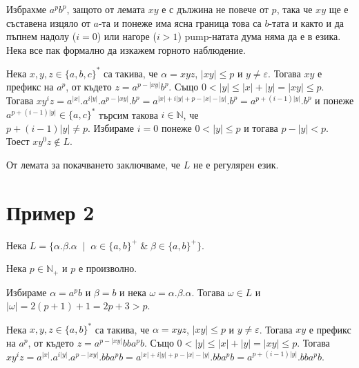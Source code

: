 \documentclass[12pt]{article}
\begin{document}
\vspace*{4mm}

\par Избрахме \(a^pb^p\), защото от лемата \(xy\) е с дължина не повече от \(p\), така че \(xy\) ще е съставена изцяло от \(a\)-та и понеже има ясна граница това са \(b\)-тата и както и да пъпнем надолу (\(i = 0\)) или нагоре (\(i > 1\)) pump-натата дума няма да е в езика. Нека все пак формално да изкажем горното наблюдение.

\vspace*{4mm}

\par Нека \(x, y, z \in \{a, b, c\}^*\) са такива, че \(\alpha = xyz\), \(|xy| \leq p\) и \(y \neq \varepsilon\).
Тогава \(xy\) е префикс на \(a^p\), от където \(z = a^{p - |xy|}b^p\). Също \(0 < |y| \leq |x| + |y| = |xy| \leq p\). Тогава \(xy^iz = a^{|x|}.a^{i|y|}.a^{p - |xy|}.b^p = a^{|x| + i|y| + p - |x| - |y|}.b^p = a^{p + (i - 1)|y|}.b^p\) и понеже \(a^{p + (i - 1)|y|} \in \{a, c\}^*\) търсим такова \(i \in \mathbb N\), че \\
\(p + (i - 1)|y| \neq p\). Избираме \(i = 0\) понеже \(0 < |y| \leq p\) и тогава \(p - |y| < p\).
Тоест \(xy^0z \notin L\).

\vspace*{4mm}

\par От лемата за покачването заключваме, че \(L\) не е регулярен език.

\section{Пример 2}
Нека \(L = \{\alpha.\beta.\alpha \;\mid\; \alpha \in \{a, b\}^+ \;\&\; \beta \in \{a, b\}^+\}\).

\vspace*{5mm}

Нека \(p \in \mathbb{N}_+\) и \(p\) е произволно.

\vspace*{5mm}

Избираме \(\alpha = a^pb\) и \(\beta = b\) и нека \(\omega = \alpha.\beta.\alpha\).
Тогава \(\omega \in L\) и \(|\omega| = 2(p + 1) + 1 = 2p + 3 > p\).

\vspace*{5mm}

\par Нека \(x, y, z \in \{a, b\}^*\) са такива, че \(\alpha = xyz\), \(|xy| \leq p\) и \(y \neq \varepsilon\).
Тогава \(xy\) е префикс на \(a^p\), от където \(z = a^{p - |xy|}bba^pb\). Също \(0 < |y| \leq |x| + |y| = |xy| \leq p\). Тогава \(xy^iz = a^{|x|}.a^{i|y|}.a^{p - |xy|}.bba^pb = a^{|x| + i|y| + p - |x| - |y|}.bba^pb = a^{p + (i - 1)|y|}.bba^pb\).
\end{document}
